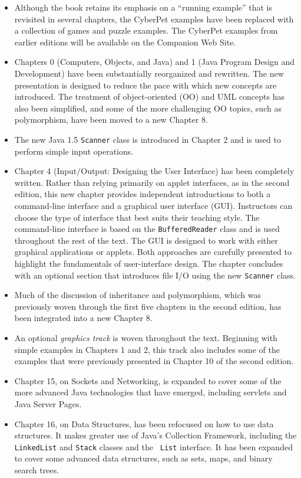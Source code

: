 \begin{itemize}

\item Although the book retains its emphasis on a ``running example''
that is revisited in several chapters, the CyberPet examples have been
replaced with a collection of games and puzzle examples. The CyberPet
examples from earlier editions will be available on the Companion Web
Site.

\item Chapters 0 (Computers, Objects, and Java) and 1 (Java Program
Design and Development) have been substantially reorganized and
rewritten. The new presentation is designed to reduce the pace with
which new concepts are introduced. The treatment of object-oriented
(OO) and UML concepts has also been simplified, and some of the more
challenging OO topics, such as polymorphism, have been moved to a
new Chapter 8.

\item The new Java 1.5 {\tt Scanner} class is introduced in Chapter 2
and is used to perform simple input operations. 

\item Chapter 4 (Input/Output: Designing the User Interface) has been
completely written. Rather than relying primarily on applet
interfaces, as in the second edition, this new chapter provides
independent introductions to both a command-line interface and a
graphical user interface (GUI). Instructors can choose the type of
interface that best suits their teaching style. The command-line
interface is based on the {\tt BufferedReader} class and is used
throughout the rest of the text. The GUI is designed to work with
either graphical applications or applets.  Both approaches are
carefully presented to highlight the fundamentals of user-interface
design.  The chapter concludes with an optional section that
introduces file I/O using the new {\tt Scanner} class.

\item Much of the discussion of inheritance and polymorphism, which
was previously woven through the first five chapters in the second
edition, has been integrated into a new Chapter 8.

\item An optional {\em graphics track} is woven throughout the text.
Beginning with simple examples in Chapters 1 and 2, this track also
includes some of the examples that were previously presented in
Chapter 10 of the second edition.

\item Chapter 15, on Sockets and Networking, is expanded to cover some
of the more advanced Java technologies that have emerged, including
servlets and Java Server Pages.

\item Chapter 16, on Data Structures, has been refocused on how to use
data structures. It makes greater use of Java's Collection Framework,
including the {\tt LinkedList} and {\tt Stack} classes and the {\tt
List} interface. It has been expanded to cover some advanced data
structures, such as sets, maps, and binary search trees.

\end{itemize}

